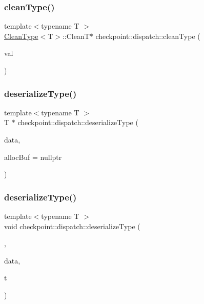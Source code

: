 \subsubsection{\texorpdfstring{clean\+Type()}{cleanType()}}
{\footnotesize\ttfamily template$<$typename T $>$ \\
\hyperlink{structcheckpoint_1_1dispatch_1_1_clean_type}{Clean\+Type}$<$T$>$\+::CleanT$\ast$ checkpoint\+::dispatch\+::clean\+Type (\begin{DoxyParamCaption}\item[{T $\ast$}]{val }\end{DoxyParamCaption})}

\mbox{\label{namespacecheckpoint_1_1dispatch_aa6898b55f6fb0de0b628567087cc8755}} 
\subsubsection{\texorpdfstring{deserialize\+Type()}{deserializeType()}\hspace{0.1cm}{\footnotesize\ttfamily [1/2]}}
{\footnotesize\ttfamily template$<$typename T $>$ \\
T $\ast$ checkpoint\+::dispatch\+::deserialize\+Type (\begin{DoxyParamCaption}\item[{\hyperlink{namespacecheckpoint_ae57f01cdc0b81776c23b6c7c934c58f5}{Serial\+Byte\+Type} $\ast$}]{data,  }\item[{\hyperlink{namespacecheckpoint_ae57f01cdc0b81776c23b6c7c934c58f5}{Serial\+Byte\+Type} $\ast$}]{alloc\+Buf = {\ttfamily nullptr} }\end{DoxyParamCaption})}

\mbox{\label{namespacecheckpoint_1_1dispatch_a1830f5dccc7209dc2bbb3b7ac238c36a}} 
\subsubsection{\texorpdfstring{deserialize\+Type()}{deserializeType()}\hspace{0.1cm}{\footnotesize\ttfamily [2/2]}}
{\footnotesize\ttfamily template$<$typename T $>$ \\
void checkpoint\+::dispatch\+::deserialize\+Type (\begin{DoxyParamCaption}\item[{\hyperlink{structcheckpoint_1_1dispatch_1_1_in_place_tag}{In\+Place\+Tag}}]{,  }\item[{\hyperlink{namespacecheckpoint_ae57f01cdc0b81776c23b6c7c934c58f5}{Serial\+Byte\+Type} $\ast$}]{data,  }\item[{T $\ast$}]{t }\end{DoxyParamCaption})}

